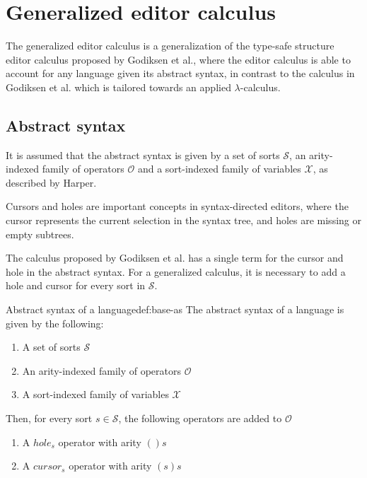 \section{Generalized editor calculus}
The generalized editor calculus\cite{aalborg} is a generalization of the type-safe structure editor calculus proposed by Godiksen et al.\cite{godiksen}, where the editor calculus is able to account for any language given its abstract syntax, in contrast to the calculus in Godiksen\cite{godiksen} et al. which is tailored towards an applied $\lambda$-calculus.

\subsection{Abstract syntax}
It is assumed that the abstract syntax is given by a set of sorts $\mathcal{S}$, an arity-indexed family of operators $\mathcal{O}$ and a sort-indexed family of variables $\mathcal{X}$, as described by Harper\cite{harper}.

Cursors and holes are important concepts in syntax-directed editors, where the cursor represents the current selection in the syntax tree, and holes are missing or empty subtrees.

The calculus proposed by Godiksen et al. \cite{godiksen} has a single term for the cursor and hole in the abstract syntax. For a generalized calculus, it is necessary to add a hole and cursor for every sort in $\mathcal{S}$.

\begin{definition}{Abstract syntax of a language}{def:base-as}
    The abstract syntax of a language is given by the following:
    
    \begin{enumerate}
        \item A set of sorts $\mathcal{S}$
        \item An arity-indexed family of operators $\mathcal{O}$
        \item A sort-indexed family of variables $\mathcal{X}$
    \end{enumerate}
    
    Then, for every sort $s \in \mathcal{S}$, the following operators are added to $\mathcal{O}$
    
    \begin{enumerate}
        \item A $hole_s$ operator with arity $()s$
        \item A $cursor_s$ operator with arity $(s)s$
    \end{enumerate}
    \end{definition}



